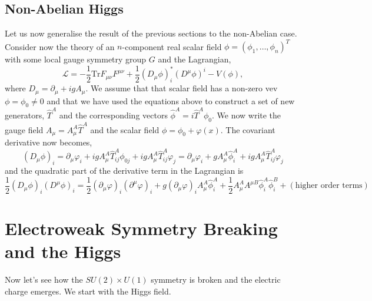 \subsection{Non-Abelian Higgs}
Let us now generalise the result of the previous sections to the non-Abelian case. Consider now the theory of an $n$-component real scalar field $\phi = (\phi_1,\dots,\phi_n)^T$ with some local gauge symmetry group $G$ and the Lagrangian, 
\begin{equation}
    \mathcal{L} = -\frac{1}{2}\text{Tr}F_{\mu\nu}F^{\mu\nu} + \frac{1}{2}(D_{\mu}\phi)_i^*(D^{\mu}\phi)^i - V(\phi),
\end{equation}
where $D_{\mu} = \partial_{\mu} + igA_{\mu}$. We assume that that scalar field has a non-zero vev $\phi = \phi_0\neq 0$ and that we have used the equations above to construct a set of new generators, $\hat{T}^A$ and the corresponding vectors $\hat{\phi}^A = i\hat{T}^A\phi_0$. We now write the gauge field $A_{\mu} = A_{\mu}^{A}\hat{T}^A$ and the scalar field $\phi = \phi_0 +\varphi(x)$. The covariant derivative now becomes, 
\begin{equation}
    (D_{\mu}\phi)_i = \partial_{\mu}\varphi_i + igA^A_{\mu}\hat{T}^A_{ij}\phi_{0j} + igA^A_{\mu}\hat{T}^A_{ij}\varphi_{j} = \partial_{\mu}\varphi_i + gA^A_{\mu}\hat{\phi}^A_{i} + igA^A_{\mu}\hat{T}^A_{ij}\varphi_{j} 
\end{equation}
and the quadratic part of the derivative term in the Lagrangian is 
\begin{equation}
    \frac{1}{2}(D_{\mu}\phi)_i(D^{\mu}\phi)_i = \frac{1}{2}(\partial_{\mu}\varphi)_i(\partial^{\mu}\varphi)_i + g(\partial_{\mu}\varphi)_iA^A_{\mu}\hat{\phi}^A_{i} + \frac{1}{2}A^A_{\mu}A^{\mu B}\hat{\phi}^A_{i}\hat{\phi}^B_{i} + (\text{higher order terms})
\end{equation}




\section{Electroweak Symmetry Breaking and the Higgs}
Now let's see how the $SU(2)\times U(1)$ symmetry is broken and the electric charge emerges. We start with the Higgs field.

